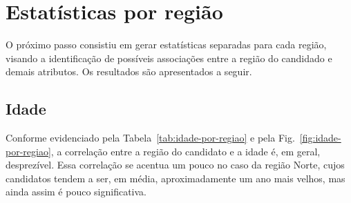 \documentclass[12pt]{article}
\newcommand{\reffig}[1]{Fig.~\ref{fig:#1}}
\newcommand{\reftab}[1]{Tabela~\ref{tab:#1}}
\begin{document}
\section{Estatísticas por região}
O próximo passo consistiu em gerar estatísticas separadas para cada região, visando a identificação de possíveis associações entre a região do candidado e demais atributos.
Os resultados são apresentados a seguir.

\subsection{Idade}
Conforme evidenciado pela \reftab{idade-por-regiao} e pela \reffig{idade-por-regiao}, a correlação entre a região do candidato e a idade é, em geral, desprezível. Essa correlação se acentua um pouco no caso da região Norte, cujos candidatos tendem a ser, em média, aproximadamente um ano mais velhos, mas ainda assim é pouco significativa.
\end{document}
